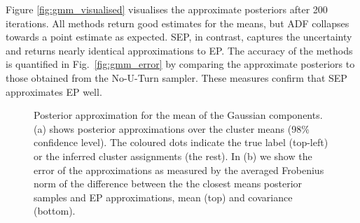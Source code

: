 
Figure \ref{fig:gmm_visualised} visualises the approximate posteriors after 200 iterations. All methods return good estimates for the means, but ADF collapses towards a point estimate as expected. SEP, in contrast, captures the uncertainty and returns nearly identical approximations to EP. The accuracy of the methods is quantified in Fig.~\ref{fig:gmm_error} by comparing the approximate posteriors to those obtained from the No-U-Turn sampler. These measures confirm that SEP approximates EP well.

\begin{figure}
\centering
\def\svgwidth{0.45\linewidth}
\subfigure[\label{fig:gmm_visualised}]{
}
%
\hspace{0.1in}
%
\def\svgwidth{0.35\linewidth}
\subfigure[\label{fig:gmm_error}]{
}
\caption{Posterior approximation for the mean of the Gaussian components. (a) shows posterior approximations over the cluster means (98\% confidence level). The coloured dots indicate the true label (top-left) or the inferred cluster assignments (the rest). In (b) we show the error of the approximations as measured by the averaged Frobenius norm of the difference between the the closest means posterior samples and EP approximations, mean (top) and covariance (bottom).}
\end{figure}
